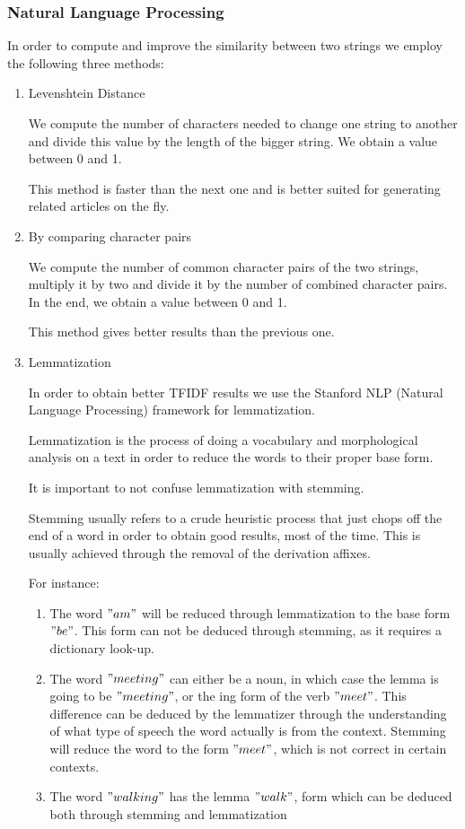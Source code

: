 \subsubsection{Natural Language Processing}
\label{sec:natural-language-processing}
In order to compute and improve the similarity between two strings we employ the following three methods:
\begin{enumerate}
	\item Levenshtein Distance

		We compute the number of characters needed to change one string to another and divide this value by the length of the bigger string. We obtain a value between 0 and 1.
		
		This method is faster than the next one and is better suited for generating related articles on the fly.

	\item By comparing character pairs
	
		We compute the number of common character pairs of the two strings, multiply it by two and divide it by the number of combined character pairs. In the end, we obtain a value between 0 and 1.
		
		This method gives better results than the previous one.
	\item Lemmatization
		
		In order to obtain better TFIDF results we use the Stanford NLP (Natural Language Processing) framework for lemmatization.

		Lemmatization is the process of doing a vocabulary and morphological analysis on a text in order to reduce the words to their proper base form.

		It is important to not confuse lemmatization with stemming.

		Stemming usually refers to a crude heuristic process that just chops off the end of a word in order to obtain good results, most of the time. This is usually achieved through the removal of the derivation affixes.

		For instance:
		\begin{enumerate}
			\item The word $"am"$ will be reduced through lemmatization to the base form $"be"$. This form can not be deduced through stemming, as it requires a dictionary look-up.
			\item The word $"meeting"$ can either be a noun, in which case the lemma is going to be $"meeting"$, or the ing form of the verb $"meet"$. This difference can be deduced by the lemmatizer through the understanding of what type of speech the word actually is from the context. Stemming will reduce the word to the form $"meet"$, which is not correct in certain contexts.
			\item The word $"walking"$ has the lemma $"walk"$, form which can be deduced both through stemming and lemmatization

		\end{enumerate}

\end{enumerate}

